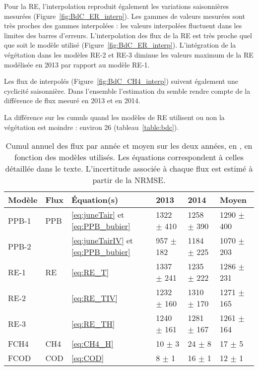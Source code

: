 Pour la RE, l'interpolation reproduit également les variations saisonnières mesurées (Figure~\ref{fig:BdC_ER_interp}).
Les gammes de valeurs mesurées sont très proches des gammes interpolées :
les valeurs interpolées fluctuent dans les limites des barres d'erreurs.
L'interpolation des flux de la RE est très proche quel que soit le modèle utilisé (Figure~\ref{fig:BdC_ER_interp}).
L'intégration de la végétation dans les modèles RE-2 et RE-3 diminue les valeurs maximum de la RE modélisée en 2013 par rapport au modèle RE-1.

Les flux de \chh interpolés (Figure~\ref{fig:BdC_CH4_interp}) suivent également une cyclicité saisonnière.
Dans l'ensemble l'estimation du \chh semble rendre compte de la différence de flux mesuré en 2013 et en 2014.

La différence sur les cumuls quand les modèles de RE utilisent ou non la végétation est moindre : environ \SI{26}{\gcma} (tableau~\ref{table:bdc}).

\begin{table}
\centering
\caption{Cumul annuel des flux par année et moyen sur les deux années, en \si{\gcma}, en fonction des modèles utilisés. Les équations correspondent à celles détaillée dans le texte. L'incertitude associée à chaque flux est estimé à partir de la NRMSE.}
\label{table:flux}
\begin{tabular}{llllll}\toprule
Modèle & Flux & Équation(s) & 2013 & 2014 & Moyen \\ \midrule
PPB-1 & PPB & \ref{eq:juneTair} et \ref{eq:PPB_bubier} & 1322 $\pm$ 410 & 1258 $\pm$ 390 & 1290 $\pm$ 400 \\
PPB-2 & & \ref{eq:juneTairIV} et \ref{eq:PPB_bubier} & 957 $\pm$ 182 & 1184 $\pm$ 225 & 1070 $\pm$ 203 \\[+1.5ex]
RE-1 & RE & \ref{eq:RE_T} & 1337 $\pm$ 241 & 1235 $\pm$ 222 & 1286 $\pm$ 231 \\
RE-2 & & \ref{eq:RE_TIV} & 1232 $\pm$ 160 & 1310 $\pm$ 170 & 1271 $\pm$ 165\\
RE-3 & & \ref{eq:RE_TH} & 1240 $\pm$ 161 & 1281 $\pm$ 167 & 1261 $\pm$ 164 \\[+1.5ex]
FCH4 & CH4 & \ref{eq:CH4_H} & 10 $\pm$ 3 & 24 $\pm$ 8 & 17 $\pm$ 5 \\[+1.5ex]
FCOD & COD & \ref{eq:COD} & 8 $\pm$ 1  & 16 $\pm$ 1 & 12 $\pm$ 1 \\
\bottomrule
\end{tabular}
\end{table}



